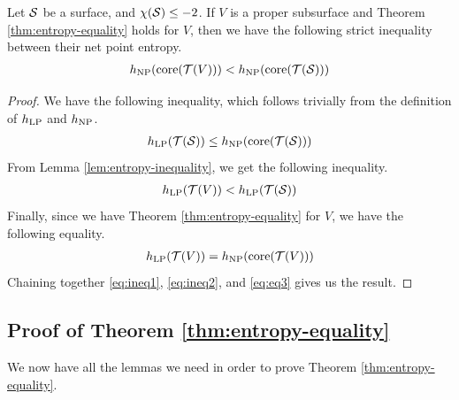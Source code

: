 \documentclass[12pt, reqno]{amsart}
\begin{document}
\begin{lemma}
  \label{lem:net-point-entropy-inequality}
  Let $\mathcal{S}$ be a surface, and $\chi(\mathcal{S}) \leq -2$. If $V$ is a proper subsurface and Theorem \ref{thm:entropy-equality} holds for $V$, then we have the following strict inequality between their net point entropy.
  \begin{align*}
    h_{\mathrm{NP}}(\mathrm{core}(\mathcal{T}(V))) < h_{\mathrm{NP}}(\mathrm{core}(\mathcal{T}(\mathcal{S})))
  \end{align*}
\end{lemma}

\begin{proof}
  We have the following inequality, which follows trivially from the definition of $h_{\mathrm{LP}}$ and $h_{\mathrm{NP}}$.
  \begin{align}
    \label{eq:ineq1}
    h_{\mathrm{LP}}(\mathcal{T}(\mathcal{S})) \leq h_{\mathrm{NP}}(\mathrm{core}(\mathcal{T}(\mathcal{S})))
  \end{align}
  From Lemma \ref{lem:entropy-inequality}, we get the following inequality.
  \begin{align}
    \label{eq:ineq2}
    h_{\mathrm{LP}}(\mathcal{T}(V)) < h_{\mathrm{LP}}(\mathcal{T}(\mathcal{S}))
  \end{align}
  Finally, since we have Theorem \ref{thm:entropy-equality} for $V$, we have the following equality.
  \begin{align}
    \label{eq:eq3}
    h_{\mathrm{LP}}(\mathcal{T}(V)) = h_{\mathrm{NP}}(\mathrm{core}(\mathcal{T}(V)))
  \end{align}
  Chaining together \eqref{eq:ineq1}, \eqref{eq:ineq2}, and \eqref{eq:eq3} gives us the result.
\end{proof}

\subsection{Proof of Theorem \ref{thm:entropy-equality}}
\label{sec:proof-theorem}

We now have all the lemmas we need in order to prove Theorem \ref{thm:entropy-equality}.
\end{document}
